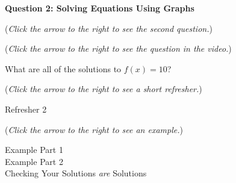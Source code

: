 \documentclass{ximera}
\begin{document}
\textbf{Question 2: Solving Equations Using Graphs}
\begin{question}
\begin{flushright}
{\color{blue}(\emph{Click the arrow to the right to see the second question.})}
\end{flushright}
\begin{center}
\begin{expandable}
{\color{blue}(\emph{Click the arrow to the right to see the question
in the video.})}
\begin{expandable}

What are all of the solutions to $f(x)=10$?

\begin{multipleChoice}
\end{multipleChoice}
\begin{flushright}
{\color{blue}(\emph{Click the arrow to the right to see a short refresher.})}
\end{flushright}
\begin{expandable}
Refresher 2
\end{expandable}
\begin{flushright}
{\color{blue}(\emph{Click the arrow to the right to see an example.})}
\end{flushright}
\begin{expandable}
Example Part 1
\\

Example Part 2
\\

Checking Your Solutions \emph{are} Solutions
\end{expandable}
\end{expandable}
\end{expandable}
\end{center}
\end{question}
\end{document}

